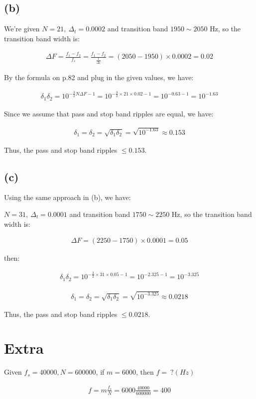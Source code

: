 \documentclass{article}
\begin{document}
\subsection*{(b)}

We're given $N = 21, \ \Delta_t = 0.0002$ and transition band $1950 \sim 2050 \text{ Hz}$,
so the transition band width is:

\begin{align*}
    \Delta F = \frac{f_1 - f_2}{f_s} = \frac{f_1 - f_2}{\frac{1}{\Delta_t}} = (2050 - 1950) \times 0.0002 = 0.02
\end{align*}

By the formula on p.82 and plug in the given values, we have:

\begin{align*}
    \delta_1 \delta_2 = 10^{-\frac{3}{2}N \Delta F - 1} = 10^{-\frac{3}{2} \times 21 \times 0.02 - 1} = 10^{-0.63 - 1} = 10^{-1.63}
\end{align*}

Since we assume that pass and stop band ripples are equal, we have:

\begin{align*}
    \delta_1 = \delta_2 = \sqrt{\delta_1 \delta_2} = \sqrt{10^{-1.63}} \approx 0.153
\end{align*}

Thus, the pass and stop band ripples $\le 0.153$.

\subsection*{(c)}

Using the same approach in (b), we have:
\bigskip

$N = 31, \ \Delta_t = 0.0001$ and transition band $1750 \sim 2250 \text{ Hz}$,
so the transition band width is:

\begin{align*}
    \Delta F = (2250 - 1750) \times 0.0001 = 0.05
\end{align*}

then:

\begin{align*}
    \delta_1 \delta_2 = 10^{-\frac{3}{2} \times 31 \times 0.05 - 1} = 10^{-2.325 - 1} = 10^{-3.325}
\end{align*}

\begin{align*}
    \delta_1 = \delta_2 = \sqrt{\delta_1 \delta_2} = \sqrt{10^{-3.325}} \approx 0.0218
\end{align*}

Thus, the pass and stop band ripples $\le 0.0218$.

\section*{Extra}

Given $f_s = 40000, N = 600000$, if $m = 6000$, then $f = \ ? (Hz)$

\begin{align*}
    f = m \frac{f_s}{N} = 6000 \frac{40000}{600000} = 400
\end{align*}
\end{document}
